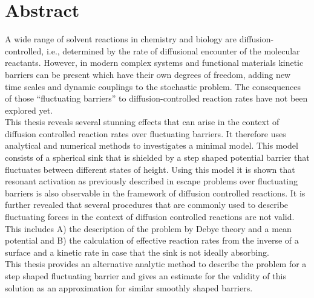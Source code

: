 \section*{Abstract}
A wide range of solvent reactions in chemistry and biology are diffusion-controlled, i.e., determined by the rate of diffusional encounter of the molecular reactants. However, in modern complex systems and functional materials kinetic barriers can be present which have their own degrees of freedom, adding new time scales and dynamic couplings to the stochastic problem. The consequences of those ``fluctuating barriers'' to diffusion-controlled reaction rates have not been explored yet. \\
This thesis reveals several stunning effects that can arise in the context of diffusion controlled reaction rates over fluctuating barriers. It therefore uses analytical and numerical methods to investigates a minimal model. This model consists of a spherical sink that is shielded by a step shaped potential barrier that fluctuates between different states of height. Using this model it is shown that resonant activation as previously described in escape problems over fluctuating barriers is also observable in the framework of diffusion controlled reactions. It is further revealed that several procedures that are commonly used to describe fluctuating forces in the context of diffusion controlled reactions are not valid. This includes A) the description of the problem by Debye theory and a mean potential and B) the calculation of effective reaction rates from the inverse of a surface and a kinetic rate in case that the sink is not ideally absorbing. \\
This thesis provides an alternative analytic method to describe the problem for a step shaped fluctuating barrier and gives an estimate for the validity of this solution as an approximation for similar smoothly shaped barriers.
\newpage

